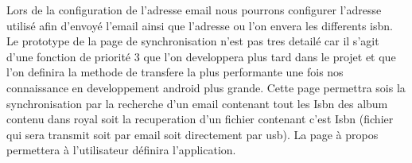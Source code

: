 Lors de la configuration de l'adresse email nous pourrons configurer l'adresse utilisé afin d'envoyé l'email ainsi que l'adresse ou l'on envera les differents isbn.
Le prototype de la page de synchronisation n'est pas tres detailé car il s'agit d'une fonction de priorité 3 que l'on developpera plus tard dans le projet et que l'on definira la methode de transfere la plus performante une fois nos connaissance en developpement android plus grande. 
Cette page permettra sois la synchronisation par la recherche d'un email contenant tout les Isbn des album contenu dans royal soit la recuperation d'un fichier contenant c'est Isbn (fichier qui sera transmit soit par email soit directement par usb).
La page à propos permettera à l'utilisateur définira l'application.